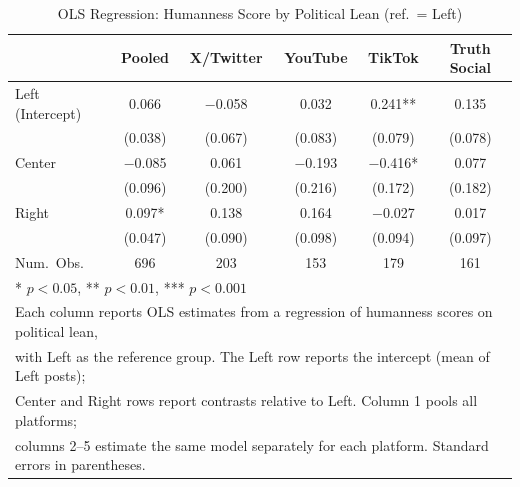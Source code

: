 \begin{table}[h]
\centering
\caption{OLS Regression: Humanness Score by Political Lean (ref.\ = Left)}
\begin{tabular}[t]{lccccc}
\toprule
  & Pooled & X/Twitter & YouTube & TikTok & Truth Social \\
\midrule
Left (Intercept)
  & 0.066 & $-$0.058 & 0.032 & 0.241** & 0.135 \\
  & (0.038) & (0.067) & (0.083) & (0.079) & (0.078) \\
Center
  & $-$0.085 & 0.061 & $-$0.193 & $-$0.416* & 0.077 \\
  & (0.096) & (0.200) & (0.216) & (0.172) & (0.182) \\
Right
  & 0.097* & 0.138 & 0.164 & $-$0.027 & 0.017 \\
  & (0.047) & (0.090) & (0.098) & (0.094) & (0.097) \\
\midrule
Num.\ Obs.  & 696 & 203 & 153 & 179 & 161 \\
\bottomrule
\multicolumn{6}{l}{\rule{0pt}{1em}* $p < 0.05$, ** $p < 0.01$, *** $p < 0.001$}\\
\multicolumn{6}{l}{\rule{0pt}{1em}Each column reports OLS estimates from a regression of humanness scores on political lean,}\\
\multicolumn{6}{l}{\rule{0pt}{1em}with Left as the reference group. The Left row reports the intercept (mean of Left posts);}\\
\multicolumn{6}{l}{\rule{0pt}{1em}Center and Right rows report contrasts relative to Left. Column 1 pools all platforms;}\\
\multicolumn{6}{l}{\rule{0pt}{1em}columns 2--5 estimate the same model separately for each platform. Standard errors in parentheses.}\\
\end{tabular}
\end{table}
